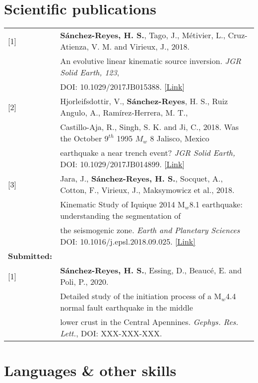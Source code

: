 \documentclass[a4paper,10.5pt]{article} %
\begin{document}
\pagebreak
\thispagestyle{empty}


\vskip 0.5cm
\section{Scientific publications}
\begin{tabular}{ll}
 [1] & {\bf S\'anchez-Reyes, H. S.}, Tago, J., Métivier, L., Cruz-Atienza, V. M. and Virieux, J., 2018. \tabularnewline 
     & An evolutive linear kinematic source inversion. {\it JGR Solid Earth, 123}, \\
     & DOI: 10.1029/2017JB015388. \href{https://agupubs.onlinelibrary.wiley.com/doi/10.1029/2017JB015388}{[Link]} \\[0.6em]

 [2] & Hjorleifsdottir, V., {\bf S\'anchez-Reyes}, H. S., Ruiz Angulo, A., Ramírez-Herrera, M. T., \tabularnewline
     & Castillo-Aja, R., Singh, S. K. and Ji, C., 2018. Was the October $9^{th}$ 1995 $M_w$ 8 Jalisco, Mexico \\
     & earthquake a near trench event? {\it JGR Solid Earth,} DOI: 10.1029/2017JB014899. \href{https://agupubs.onlinelibrary.wiley.com/doi/10.1029/2017JB014899}{[Link]} \\[0.6em]
     
 [3] & Jara, J., {\bf S\'anchez-Reyes, H. S.}, Socquet, A., Cotton, F., Virieux, J., Maksymowicz et al., 2018. \\
     & Kinematic Study of Iquique 2014 M$_w$8.1 earthquake: understanding the segmentation of \\
     & the seismogenic zone. {\it Earth and Planetary Sciences} DOI: 10.1016/j.epsl.2018.09.025. \href{https://www.sciencedirect.com/science/article/pii/S0012821X18305648}{[Link]} \\[0.6em]
     
{\bf Submitted:} & \\[0.6em]

 [1] & {\bf S\'anchez-Reyes, H. S.}, Essing, D., Beauc\'e, E. and Poli, P., 2020. \tabularnewline 
     & Detailed study of the initiation process of a M$_w$4.4 normal fault earthquake in the middle \\
     & lower crust in the Central Apennines. {\it Gephys. Res. Lett.}, DOI: XXX-XXX-XXX. 
\end{tabular}

\vskip 0.5cm
\section{Languages \hspace{0.55cm} \& \hspace{0.55cm} other skills}
\end{document}
